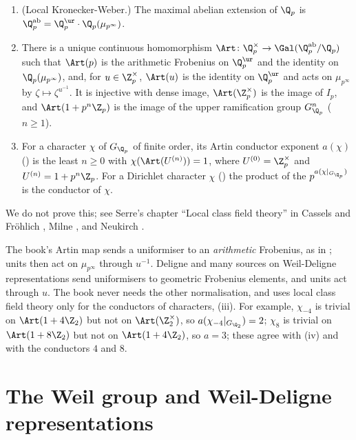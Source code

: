 \begin{theorem}\label{thm:local:lcft}
\begin{enumerate}[label=(\roman*)]
\item (Local Kronecker-Weber.) The maximal abelian extension of $\Q_p$ is $\Q_p^{\mathrm{ab}}=\Q_p^{\ur}\cdot\Q_p(\mu_{p^\infty})$.
\item There is a unique continuous homomorphism $\Art\colon\Q_p^\times\to\Gal(\Q_p^{\mathrm{ab}}/\Q_p)$ such that $\Art(p)$ is the arithmetic Frobenius on $\Q_p^{\ur}$ and the
identity on $\Q_p(\mu_{p^\infty})$, and, for $u\in\Z_p^\times$, $\Art(u)$ is the identity on $\Q_p^{\ur}$ and acts on $\mu_{p^\infty}$ by $\zeta\mapsto\zeta^{u^{-1}}$. It is
injective with dense image, $\Art(\Z_p^\times)$ is the image of $I_p$, and $\Art(1+p^n\Z_p)$ is the image of the upper ramification group $G_{\Q_p}^n$ ($n\ge1$).
\item For a character $\chi$ of $G_{\Q_p}$ of finite order, its Artin conductor exponent $a(\chi)$ () is the least $n\ge0$ with
$\chi(\Art(U^{(n)}))=1$, where $U^{(0)}=\Z_p^\times$ and $U^{(n)}=1+p^n\Z_p$. For a Dirichlet character $\chi$ () the product of the
$p^{a(\chi|_{G_{\Q_p}})}$ is the conductor of $\chi$.
\end{enumerate}
We do not prove this; see Serre's chapter ``Local class field theory'' in Cassels and Fr\"ohlich \cite{CasselsFrohlich}, Milne \cite[Chapter I]{MilneCFT},
and Neukirch \cite[Chapter V]{Neukirch}.
\end{theorem}

\begin{warning}\label{warn:local:artin}
The book's Artin map sends a uniformiser to an \emph{arithmetic} Frobenius, as in ; units then act on $\mu_{p^\infty}$ through $u^{-1}$.
Deligne \cite{Deligne73} and many sources on Weil-Deligne representations send uniformisers to geometric Frobenius elements, and units act through
$u$. The book never needs the other normalisation, and uses local class field theory only for the conductors of characters,
(iii). For example, $\chi_{-4}$ is trivial on $\Art(1+4\Z_2)$ but not on $\Art(\Z_2^\times)$, so $a(\chi_{-4}|_{G_{\Q_2}})=2$; $\chi_8$ is trivial on
$\Art(1+8\Z_2)$ but not on $\Art(1+4\Z_2)$, so $a=3$; these agree with (iv) and with the conductors $4$ and $8$.
\end{warning}

\section{The Weil group and Weil-Deligne representations}\label{sec:local:wd}

